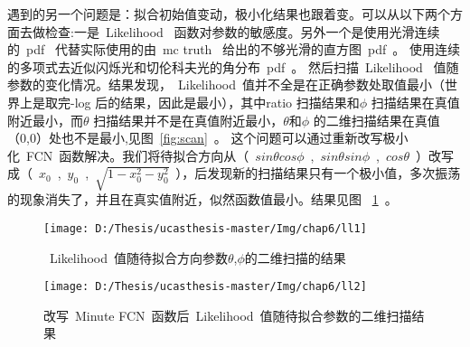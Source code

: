 遇到的另一个问题是：拟合初始值变动，极小化结果也跟着变。可以从以下两个方面去做检查:一是~Likelihood~ 函数对参数的敏感度。另外一个是使用光滑连续的~pdf~ 代替实际使用的由~mc truth~ 给出的不够光滑的直方图~pdf~。 使用连续的多项式去近似闪烁光和切伦科夫光的角分布~pdf~。 然后扫描~Likelihood~ 值随参数的变化情况。结果发现，~Likelihood~值并不全是在正确参数处取值最小（世界上是取完-log 后的结果，因此是最小），其中ratio 扫描结果和$\phi$ 扫描结果在真值附近最小，而$\theta$ 扫描结果并不是在真值附近最小，$\theta$和$\phi$ 的二维扫描结果在真值（0,0）处也不是最小,见图~\ref{fig:scan}~。 这个问题可以通过重新改写极小化~FCN~函数解决。我们将待拟合方向从（~$sin\theta cos\phi$~,~$sin\theta sin\phi$~,~$cos\theta$~）改写成（~$ x_0$~,~$y_0$~,~$\sqrt{1-x^2_0-y^2_0}$~），后发现新的扫描结果只有一个极小值，多次振荡的现象消失了，并且在真实值附近，似然函数值最小。结果见图
~\ref{fig:postscan}~。
\begin{figure}[!htb]
\begin{minipage}[t]{0.48\linewidth}
  \centering
     \texttt{[image: D:/Thesis/ucasthesis-master/Img/chap6/ll1]}
    \caption{~Likelihood~值随待拟合方向参数$\theta$,$\phi$的二维扫描的结果}
    \label{fig:scan}
  \end{minipage}%
  \quad\quad
  \begin{minipage}[t]{0.48\linewidth}
  \centering
    \texttt{[image: D:/Thesis/ucasthesis-master/Img/chap6/ll2]}
    \caption{改写~Minute FCN~函数后~Likelihood~值随待拟合参数的二维扫描结果}
    \label{fig:postscan}
  \end{minipage}
  \end{figure}

